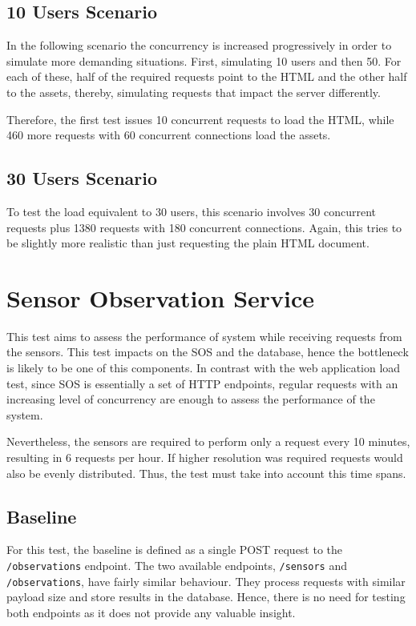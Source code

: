 \subsection*{10 Users Scenario}

In the following scenario the concurrency is increased progressively in order to simulate more demanding situations. First, simulating 10 users and then 50. For each of these, half of the required requests point to the HTML and the other half to the assets, thereby, simulating requests that impact the server differently.

Therefore, the first test issues 10 concurrent requests to load the HTML, while 460 more requests with 60 concurrent connections load the assets.

\subsection*{30 Users Scenario}

To test the load equivalent to 30 users, this scenario involves 30 concurrent requests plus 1380 requests with 180 concurrent connections. Again, this tries to be slightly more realistic than just requesting the plain HTML document.

\section{Sensor Observation Service}

This test aims to assess the performance of system while receiving requests from the sensors. This test impacts on the SOS and the database, hence the bottleneck is likely to be one of this components. In contrast with the web application load test, since SOS is essentially a set of HTTP endpoints, regular requests with an increasing level of concurrency are enough to assess the performance of the system.

Nevertheless, the sensors are required to perform only a request every 10 minutes, resulting in 6 requests per hour. If higher resolution was required requests would also be evenly distributed. Thus, the test must take into account this time spans.

\subsection*{Baseline}

For this test, the baseline is defined as a single POST request to the \texttt{/observations} endpoint. The two available endpoints, \texttt{/sensors} and \texttt{/observations}, have fairly similar behaviour. They process requests with similar payload size and store results in the database. Hence, there is no need for testing both endpoints as it does not provide any valuable insight.

